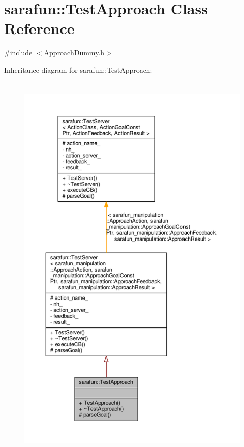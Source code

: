 \hypertarget{classsarafun_1_1TestApproach}{\section{sarafun\-:\-:Test\-Approach Class Reference}
\label{classsarafun_1_1TestApproach}
}


{\ttfamily \#include $<$Approach\-Dummy.\-h$>$}



Inheritance diagram for sarafun\-:\-:Test\-Approach\-:
\nopagebreak
\begin{figure}[H]
\begin{center}
\leavevmode
\includegraphics[height=550pt]{d9/d9a/classsarafun_1_1TestApproach__inherit__graph}
\end{center}
\end{figure}


